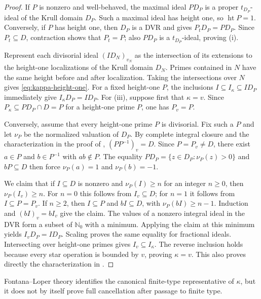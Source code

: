 \documentclass[11pt]{amsart}
\theoremstyle{definition}
\theoremstyle{remark}
\begin{document}
\begin{proof}
If $P$ is nonzero and well-behaved, the maximal ideal $PD_P$ is a
proper $t_{D_P}$-ideal of the Krull domain $D_P$.  Such a maximal ideal has
height one, so $\operatorname{ht}P=1$.  Conversely, if $P$ has height one,
then $D_P$ is a DVR and  gives
$P_tD_P=PD_P$.  Since $P_t\subseteq D$, contraction shows that $P_t=P$;
also $PD_P$ is a $t_{D_P}$-ideal, proving (i).

Represent each divisorial ideal $(ID_N)_{v_N}$ as the intersection of its
extensions to the height-one localizations of the Krull domain $D_N$.
Primes contained in $N$ have the same height before and after localization.
Taking the intersections over $N$ gives \eqref{eq:kappa-height-one}.
For a fixed height-one $P$, the inclusions
$I\subseteq I_\kappa\subseteq ID_P$ immediately give
$I_\kappa D_P=ID_P$.  For (iii), suppose first that $\kappa=v$.  Since
$P_\kappa\subseteq PD_P\cap D=P$ for a height-one prime $P$, one has
$P_v=P$.

Conversely, assume that every height-one prime $P$ is divisorial.  Fix such
a $P$ and let $\nu_P$ be the normalized valuation of $D_P$.
By complete integral closure and the characterization in the proof of
, $(PP^{-1})_v=D$.  Since $P=P_v\ne D$, there exist
$a\in P$ and $b\in P^{-1}$ with $ab\notin P$.  The equality
$PD_P=\{z\in D_P:\nu_P(z)>0\}$ and $bP\subseteq D$ then force
$\nu_P(a)=1$ and $\nu_P(b)=-1$.

We claim that if $I\subseteq D$ is nonzero and $\nu_P(I)\geq n$ for an
integer $n\geq0$, then $\nu_P(I_v)\geq n$.  For $n=0$ this follows
from $I_v\subseteq D$; for $n=1$ it follows from $I\subseteq P=P_v$.
If $n\geq2$, then $I\subseteq P$ and $bI\subseteq D$, with
$\nu_P(bI)\geq n-1$.  Induction and $(bI)_v=bI_v$ give the claim.
The values of a nonzero integral ideal in the DVR form a subset of
$\mathbb N_0$ with a minimum.  Applying the claim at this minimum yields
$I_vD_P=ID_P$.  Scaling proves the same equality for fractional ideals.
Intersecting over height-one primes gives $I_v\subseteq I_\kappa$.
The reverse inclusion holds because every star operation is bounded by
$v$, proving $\kappa=v$.  This also proves directly the characterization
in \cite[Corollary~4.10]{HoustonZafrullah}.
\end{proof}

Fontana--Loper theory identifies the canonical finite-type representative of
$\kappa$, but it does not by itself prove full cancellation after passage to
finite type.
\end{document}
